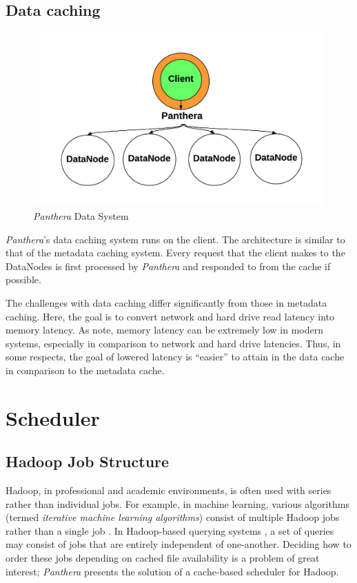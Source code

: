 \documentclass[12pt]{article}
\begin{document}
\subsection{Data caching} \label{sect:data_caching}

\begin{figure}[!h]
	\caption{\textit{Panthera} Data System}
	\centering
		\includegraphics[scale=0.4]{assets/panthera_data_architecture.pdf}
\end{figure}

\textit{Panthera}'s data caching system runs on the client. The architecture is similar to that of the metadata caching system. Every request that the client makes to the DataNodes is first processed by \textit{Panthera} and responded to from the cache if possible. 

The challenges with data caching differ significantly from those in metadata caching. Here, the goal is to convert network and hard drive read latency into memory latency. As \cite{ramcloud, hadoop} note, memory latency can be extremely low in modern systems, especially in comparison to network and hard drive latencies. Thus, in some respects, the goal of lowered latency is ``easier'' to attain in the data cache in comparison to the metadata cache. 

\section{Scheduler} \label{sect:scheduler}
\subsection{Hadoop Job Structure}
Hadoop, in professional and academic environments, is often used with series rather than individual jobs. For example, in machine learning, various algorithms (termed \textit{iterative machine learning algorithms}) consist of multiple Hadoop jobs rather than a single job \cite{spark}. In Hadoop-based querying systems \cite{hive, pig}, a set of queries may consist of jobs that are entirely independent of one-another. Deciding how to order these jobs depending on cached file availability is a problem of great interest; \textit{Panthera} presents the solution of a cache-based scheduler for Hadoop.
\end{document}
